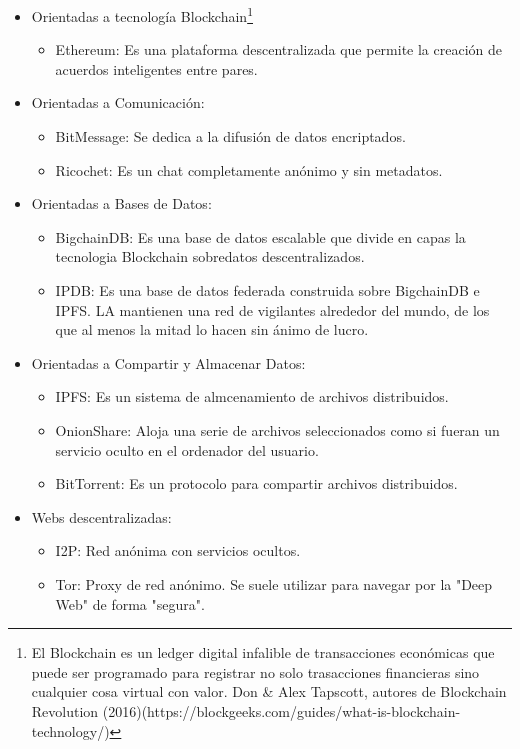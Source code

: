 \documentclass[12pt]{article} %
\begin{document}
\begin{itemize}
  \item Orientadas a tecnología Blockchain\footnote{El Blockchain es un ledger digital infalible de transacciones económicas que puede ser programado para registrar no solo trasacciones financieras sino cualquier cosa virtual con valor. Don \& Alex Tapscott, autores de Blockchain Revolution (2016)(https://blockgeeks.com/guides/what-is-blockchain-technology/)}
  \begin{itemize}
    \item Ethereum: Es una plataforma descentralizada que permite la creación de acuerdos inteligentes entre pares.
  \end{itemize}
  \item Orientadas a Comunicación:
  \begin{itemize}
    \item BitMessage: Se dedica a la difusión de datos encriptados.
    \item Ricochet: Es un chat completamente anónimo y sin metadatos.
  \end{itemize}
  \item Orientadas a Bases de Datos:
  \begin{itemize}
    \item BigchainDB: Es una base de datos escalable que divide en capas la tecnologia Blockchain sobredatos descentralizados.
    \item IPDB: Es una base de datos federada construida sobre BigchainDB e IPFS. LA mantienen una red de vigilantes alrededor del mundo, de los que al menos la mitad lo hacen sin ánimo de lucro.
  \end{itemize}
  \item Orientadas a Compartir y Almacenar Datos:
  \begin{itemize}
    \item IPFS: Es un sistema de almcenamiento de archivos distribuidos.
    \item OnionShare: Aloja una serie de archivos seleccionados como si fueran un servicio oculto en el ordenador del usuario.
    \item BitTorrent: Es un protocolo para compartir archivos distribuidos.
  \end{itemize}
  \item Webs descentralizadas:
    \begin{itemize}
      \item I2P: Red anónima con servicios ocultos.
      \item Tor: Proxy de red anónimo. Se suele utilizar para navegar por la "Deep Web" de forma "segura".

\end{itemize}
\end{itemize}
\end{document}
